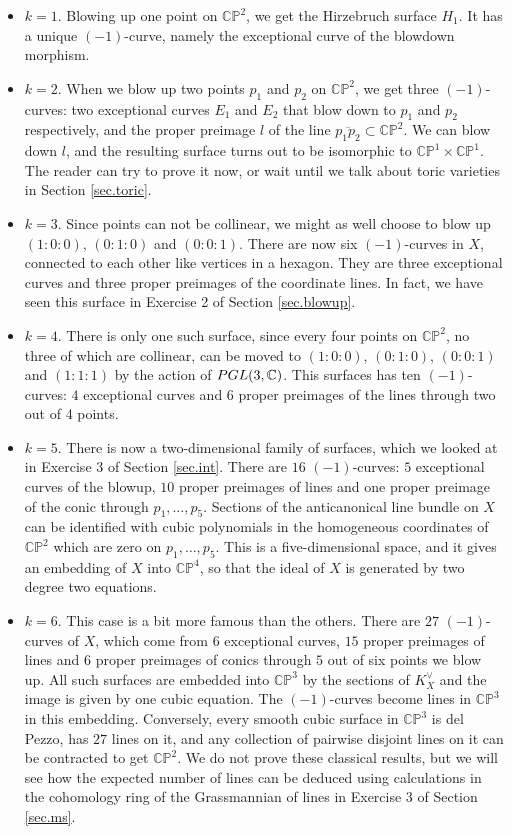 \documentclass[11pt]{article}
\numberwithin{equation}{section}
\numberwithin{footnote}{section}
\renewcommand{\P}{{\mathbb P}}
\newcommand{\C}{{\mathbb C}}
\begin{document}
\begin{itemize}
\item $k=1.$ Blowing up one point on $\C\P^2$, we get the Hirzebruch surface $H_1$. It has a unique $(-1)$-curve, namely the exceptional curve of the blowdown morphism.

\item $k=2.$ When we blow up two points $p_1$ and $p_2$ on $\C\P^2$, we get three $(-1)$-curves: two exceptional curves $E_1$ and $E_2$ that blow down to $p_1$ and $p_2$ respectively, and the proper preimage $l$ of the line $\overline{p_1p_2}\subset \C\P^2$. We can blow down $l$, and the resulting surface turns out to be isomorphic to $\C\P^1\times \C\P^1$. The reader can try to prove it now, or wait until we talk about toric varieties in Section \ref{sec.toric}. 

\item $k=3.$ Since points can not be collinear, we might as well choose to blow up $(1:0:0)$, $(0:1:0)$ and $(0:0:1)$. 
There are now six $(-1)$-curves in $X$, connected to each other like vertices in a hexagon. They are  three exceptional curves and three proper preimages of the coordinate lines. In fact, we have seen this surface in Exercise 2 of Section \ref{sec.blowup}.

\item $k=4.$ There is only one such surface, since every four points on $\C\P^2$, no three of which are collinear, can be
moved to $(1:0:0)$, $(0:1:0)$, $(0:0:1)$ and $(1:1:1)$ by the action of ${\rm PGL}(3,\C)$. This surfaces has 
ten $(-1)$-curves: $4$ exceptional curves and $6$ proper preimages of the lines through two out of $4$ points. 

\item $k=5.$ There is now a two-dimensional family of surfaces, which we looked at in Exercise 3 of Section \ref{sec.int}.
There are $16$  $(-1)$-curves: $5$ exceptional curves of the blowup, $10$ proper preimages of lines and one proper preimage of the conic through $p_1,\ldots, p_5$. Sections of the anticanonical line bundle on $X$ can be identified with 
cubic polynomials in the homogeneous coordinates of $\C\P^2$ which are zero on $p_1,\ldots, p_5$. This is a five-dimensional space, and it gives an embedding of $X$ into $\C\P^4$, so that the ideal of $X$ is generated by two degree two equations.

\item $k=6.$ This case is a bit more famous than the others. There are $27$ $(-1)$-curves of $X$, which come from
$6$ exceptional curves, $15$ proper preimages of lines and $6$ proper preimages of conics through $5$ out of six points we blow up. All such surfaces are embedded into $\C\P^3$ by the sections of $K_X^\vee$ and the image is given by one cubic equation. The $(-1)$-curves become lines in $\C\P^3$ in this embedding. Conversely, every smooth cubic surface in $\C\P^3$ is del Pezzo, has $27$ lines on it, and any collection of pairwise disjoint lines on it can be contracted to get
$\C\P^2$. We do not prove these classical results, but we will see how the expected number of lines can be deduced using calculations in the cohomology ring of the Grassmannian of lines in Exercise 3 of Section \ref{sec.ms}.


\end{itemize}
\end{document}
